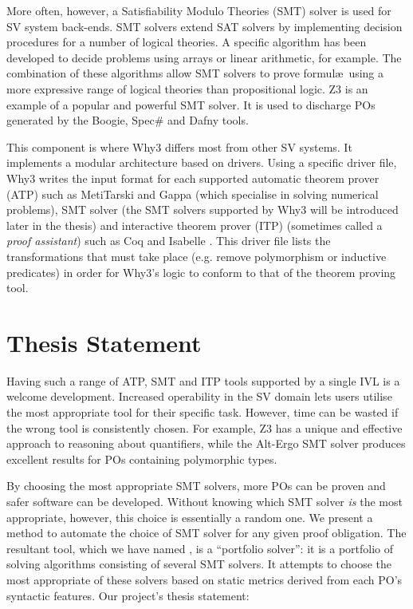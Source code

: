 More often, however, a Satisfiability Modulo Theories (SMT) solver is used for SV system back-ends. SMT solvers extend SAT solvers by implementing decision procedures for a number of logical theories. A specific algorithm has been developed to decide problems using arrays or linear arithmetic, for example. The combination of these algorithms allow SMT solvers to prove formul\ae~using a more expressive range of logical theories than propositional logic. Z3 \cite{Z3} is an example of a popular and powerful SMT solver. It is used to discharge POs generated by the Boogie, Spec\# and Dafny tools. 

This component is where \textsf{Why3} differs most from other SV systems.
It implements a modular architecture based on drivers.
Using a specific driver file, \textsf{Why3} writes the input format for each supported automatic theorem prover (ATP) such as MetiTarski \cite{Akbarpour2008} and Gappa \cite{gappa} (which specialise in solving numerical problems), SMT solver (the SMT solvers supported by \textsf{Why3} will be introduced later in the thesis) and interactive theorem prover (ITP) (sometimes called a \textit{proof assistant}) such as Coq \cite{Coq} and Isabelle \cite{Isabelle}.
This driver file lists the transformations that must take place (e.g. remove polymorphism or inductive predicates) in order for \textsf{Why3}'s logic to conform to that of the theorem proving tool.

\section{Thesis Statement}

Having such a range of ATP, SMT and ITP tools supported by a single IVL is a welcome development.
Increased operability in the SV domain lets users utilise the most appropriate tool for their specific task.
However, time can be wasted if the wrong tool is consistently chosen. 
For example, Z3 has a unique and effective approach to reasoning about quantifiers, while the Alt-Ergo \cite{AltErgo} SMT solver produces excellent results for POs containing polymorphic types.

By choosing the most appropriate SMT solvers, more POs can be proven and safer software can be developed.
Without knowing which SMT solver \textit{is} the most appropriate, however, this choice is essentially a random one.
We present a method to automate the choice of SMT solver for any given proof obligation.
The resultant tool, which we have named \where, is a ``portfolio solver'': it is a portfolio of solving algorithms consisting of several SMT solvers.
It attempts to choose the most appropriate of these solvers based on static metrics derived from each PO's syntactic features.  
Our project's thesis statement: 
 
